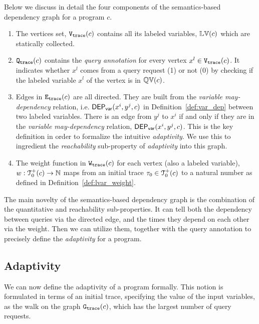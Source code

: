 Below we discuss in detail the four components of the semantics-based dependency graph for a program $c$.
\begin{enumerate}
 \item The vertices set, $\mathtt{{V_{trace}}}({c})$ contains all its labeled variables, $\mathbb{LV}(c)$ which are statically collected.
 \item $\mathtt{{Q_{trace}}}(c)$ contains the \emph{query annotation} for 
 every vertex $x^l \in \mathtt{{V_{trace}}}(c)$. It indicates whether $x^l$ comes from a query request (1) or not (0) by checking if the labeled variable $x^l$ of the vertex is in $\mathbb{QV}(c)$.
 \item Edges in $\mathtt{{E_{trace}}}(c)$ are all directed.
 They are built from the \emph{variable may-dependency} relation, i.e. $\mathsf{DEP_{var}}(x^i, y^j, c)$ in Definition~\ref{def:var_dep} between two labeled variables.
 There is an edge from $y^j$ to $x^i$ if and only if they are in the \emph{variable may-dependency} relation, $\mathsf{DEP_{var}}(x^i, y^j, c)$. 
 This is the key definition in order to formalize the intuitive \emph{adaptivity}. We use this to ingredient the \emph{reachability} sub-property of \emph{adaptivity} into this graph.
 \item 
The weight function in $\mathtt{{W_{trace}}}(c)$ for each vertex (also a labeled variable), $w : \mathcal{T}^{+}_0(c) \to \mathbb{N}$
maps from an initial trace $\mathtt{\tau}_0 \in \mathcal{T}^{+}_0(c)$ to a natural number as defined in Definition~\ref{def:lvar_weight}.

\end{enumerate}
The main novelty of the semantics-based dependency graph is the combination of the quantitative and reachability sub-properties. 
It can tell both the dependency between queries via the directed edge, and the times they depend on each other via the weight.
Then we can utilize them, together with the query annotation to precisely define the \emph{adaptivity} for a program.



\subsection{Adaptivity}
We can now define the adaptivity of a program formally. This notion is formulated in terms of an initial trace, specifying the value of the input variables, as the walk on the graph $\mathtt{{G_{trace}}}({c})$, which has the largest number of query requests.



